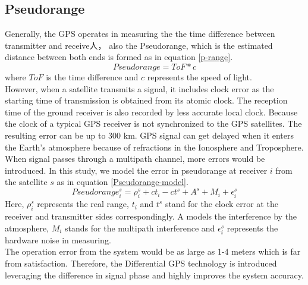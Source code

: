 \documentclass[journal,onecolumn]{IEEEtran}
\begin{document}
\subsection{Pseudorange}
Generally, the GPS operates in measuring the the time difference between transmitter
and receive人， also the Pseudorange, which is the estimated distance between both ends
is formed as in equation \ref{p-range}.
\begin{equation}
  Pseudorange = ToF * c
  \label{p-range}
\end{equation}
where $ToF$ is the time difference and $c$ represents the speed of light.\\
However, when a satellite transmits a signal, it includes clock error as the starting time
of transmission is obtained from its atomic clock. The reception time of the
ground receiver is also recorded by less accurate local clock. Because the clock
of a typical GPS receiver is not synchronized to the GPS satellites.
The resulting error can be up to 300 km. GPS signal can get delayed when it enters
the Earth’s atmosphere because of refractions in the Ionosphere and Troposphere.
When signal passes through a multipath channel, more errors would be introduced.
In this study, we model the error in pseudorange at receiver $i$ from the satellite
$s$ as in equation \ref{Pseudorange-model}.
\begin{equation}
  Pseudorange_i^s = \rho_i^s + ct_i - ct^s + A^s + M_i + \epsilon_i^s
  \label{Pseudorange-model}
\end{equation}
Here, $\rho_i^s$ represents the real range, $t_i$ and $t^s$ stand for the clock error at
the receiver and transmitter sides correspondingly. A models the interference by the
atmosphere, $M_i$ stands for the multipath interference and $\epsilon_i^s$ represents
the hardware noise in measuring.\\
The operation error from the system would be as large as 1-4 meters which is far from
satisfaction. Therefore, the Differential GPS technology is introduced leveraging
the difference in signal phase and highly improves the system accuracy.\\
\end{document}
